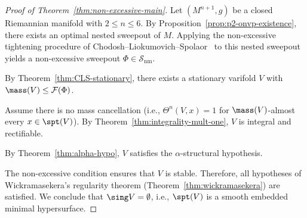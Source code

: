 \begin{proof}[Proof of Theorem~\ref{thm:non-excessive-main}]
Let $(M^{n+1}, g)$ be a closed Riemannian manifold with $2 \leq n \leq 6$. By Proposition~\ref{prop:p2-onvp-existence}, there exists an optimal nested sweepout of $M$. Applying the non-excessive tightening procedure of
Chodosh--Liokumovich--Spolaor~\cite{CLS22} to this nested sweepout yields a non-excessive sweepout
$\Phi \in \mathcal{S}_{\text{nm}}$.

By Theorem~\ref{thm:CLS-stationary}, there exists a stationary varifold $V$ with $\mass(V) \leq \mathcal{F}(\Phi)$.

Assume there is no mass cancellation (i.e., $\Theta^n(V,x)=1$ for $\mass(V)$-almost every $x \in \spt(V)$).
By Theorem~\ref{thm:integrality-mult-one}, $V$ is integral and rectifiable.

By Theorem~\ref{thm:alpha-hypo}, $V$ satisfies the $\alpha$-structural hypothesis.

The non-excessive condition ensures that $V$ is stable. Therefore, all hypotheses of Wickramasekera's regularity
theorem (Theorem~\ref{thm:wickramasekera}) are satisfied. We conclude that $\sing V = \emptyset$, i.e., $\spt(V)$
is a smooth embedded minimal hypersurface.
\end{proof}

